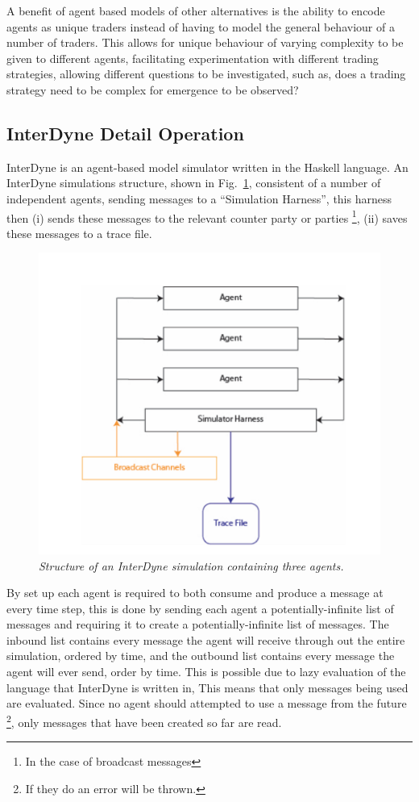 \documentclass{article}
\begin{document}
A benefit of agent based models of other alternatives is the ability to encode agents as unique traders instead of having to model the general behaviour of a number of traders. This allows for unique behaviour of varying complexity to be given to different agents, facilitating experimentation with different trading strategies, allowing different questions to be investigated, such as, does a trading strategy need to be complex for emergence to be observed? 




\subsection{InterDyne Detail Operation}
InterDyne is an agent-based model simulator written in the Haskell language. An InterDyne simulations structure, shown in Fig.~\ref{fig:harness_setupfigure}, consistent of a number of independent agents, sending messages to a ``Simulation Harness'', this harness then (i) sends these messages to the relevant counter party or parties \footnote{In the case of broadcast messages}, (ii) saves these messages to a trace file.   
\begin{figure}[H]
	\centering
	\includegraphics[scale=0.5]{harness_setup}
	\caption{\it Structure of an InterDyne simulation containing three agents.}
	\label{fig:harness_setupfigure}
\end{figure} 
By set up each agent is required to both consume and produce a message at every time step, this is done by sending each agent a potentially-infinite list of messages and requiring it to create a potentially-infinite list of messages. The inbound list contains every message the agent will receive through out the entire simulation, ordered by time, and the outbound list contains every message the agent will ever send, order by time. This is possible due to lazy evaluation of the language that InterDyne is written in, This means that only messages being used are evaluated. Since no agent should attempted to use a message from the future \footnote{If they do an error will be thrown.}, only messages that have been created so far are read.\\
\end{document}
